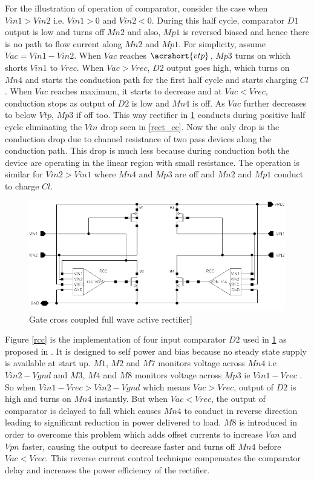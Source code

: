 \documentclass[12pt,a4paper,UKenglish]{report}
\begin{document}
For the illustration of operation of comparator, consider the case when $Vin1 > Vin2$ i.e. $Vin1 > 0$ and $Vin2 < 0$. During this half cycle, comparator $D1$ output is low and turns off $Mn2$ and also, $Mp1$ is reversed biased and hence there is no path to flow current along $Mn2$ and $Mp1$. For simplicity, assume $Vac =  Vin1 - Vin2$. When $Vac$ reaches $\acrshort{vtp}$, $Mp3$ turns on which shorts $Vin1$ to $Vrec$. When $Vac > Vrec$, $D2$ output goes high, which turns on $Mn4$ and starts the conduction path for the first half cycle and starts charging $Cl$. When $Vac$ reaches maximum, it starts to decrease and at $Vac < Vrec$, conduction stops as output of $D2$ is low and $Mn4$ is off. As $Vac$ further decreases to below $Vtp$, $Mp3$ if off too. This way rectifier in \ref{rect_rcc}  conducts during positive half cycle eliminating the $Vtn$ drop seen in \ref{rect_cc}. Now the only drop is the conduction drop due to channel resistance of two pass devices along the conduction path. This drop is much less because during conduction both the device are operating in the linear region with small resistance. The operation is similar for $Vin2 > Vin1$ where $Mn4$ and $Mp3$ are off and $Mn2$ and $Mp1$ conduct to charge $Cl$. \\

\begin{figure}[htbp] %
   \centering
   \includegraphics[width=\textwidth]{img/rectifier_schematic.pdf} 
   \caption{Gate cross coupled full wave active rectifier]}
   \label{rect_rcc}
\end{figure}

Figure \ref{rcc}  is the implementation of four input comparator $D2$ used in \ref{rect_rcc} as proposed in \cite{rectrcc}. It is designed to self power and bias because no steady state supply is available at start up. $M1$, $M2$ and $M7$ monitors voltage across $Mn4$ i.e $Vin2 - Vgnd$ and $M3$, $M4$ and $M8$ monitors voltage across $Mp3$ ie $Vin1 - Vrec$ . So when $Vin1 - Vrec > Vin2 - Vgnd$ which means $Vac > Vrec$, output of $D2$ is high and turns on $Mn4$ instantly. But when $Vac < Vrec$, the output of comparator is delayed to fall which causes $Mn4$ to conduct in reverse direction leading to significant reduction in power delivered to load. $M8$ is introduced in order to overcome this problem which adds offset currents to increase $Van$ and $Vpn$ faster, causing the output to decrease faster and turns off $Mn4$ before $Vac < Vrec$. This reverse current control technique compensates the comparator delay and increases the power efficiency of the rectifier. \\
\end{document}
